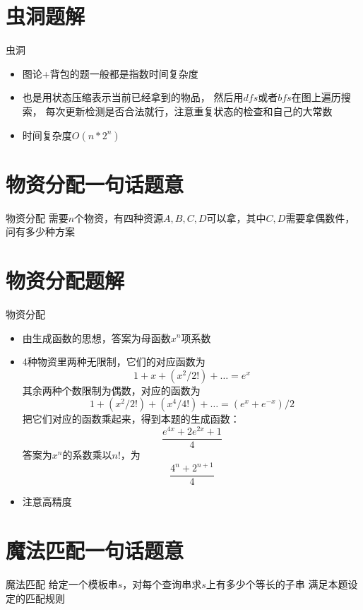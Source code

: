 \documentclass{beamer}
\begin{document}
\section{虫洞题解}
\begin{frame} {虫洞}
\begin{itemize}
  \item 图论+背包的题一般都是指数时间复杂度
  \item 也是用状态压缩表示当前已经拿到的物品，
  然后用$dfs$或者$bfs$在图上遍历搜索，
  每次更新检测是否合法就行，注意重复状态的检查和自己的大常数
  \item 时间复杂度$O(n*2^n)$
\end{itemize}
\end{frame}


\section{物资分配一句话题意}
\begin{frame} {物资分配}
  需要$n$个物资，有四种资源$A,B,C,D$可以拿，其中$C,D$需要拿偶数件，
  问有多少种方案
\end{frame}
\section{物资分配题解}
\begin{frame} {物资分配}
\begin{itemize}
  \item 由生成函数的思想，答案为母函数$x^n$项系数
  \item 
  4种物资里两种无限制，它们的对应函数为
  $$1+x+(x^2/2!)+…  =e^x$$
  其余两种个数限制为偶数，对应的函数为
  $$1+(x^2/2!)+(x^4/4!)+…  = (e^x+e^{-x})/2$$
  把它们对应的函数乘起来，得到本题的生成函数：
  $$\frac{e^{4x}+2e^{2x}+1}{4}$$
  答案为$x^n$的系数乘以$n!$，为
  $$\frac{4^n+2^{n+1}}{4}$$
  \item 注意高精度
\end{itemize}
\end{frame}


\section{魔法匹配一句话题意}
\begin{frame} {魔法匹配}
  给定一个模板串$s$，对每个查询串求$s$上有多少个等长的子串
  满足本题设定的匹配规则
\end{frame}
\end{document}
